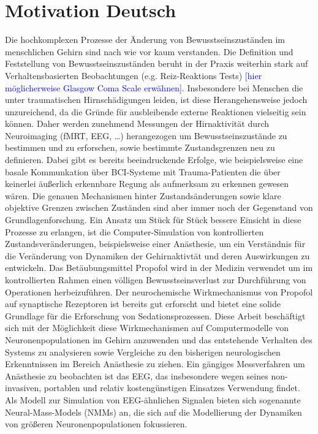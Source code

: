 \section{Motivation Deutsch}\label{sec:motivation-deutsch}
Die hochkomplexen Prozesse der Änderung von Bewusstseinszuständen im menschlichen Gehirn sind nach wie vor kaum
verstanden.
Die Definition und Feststellung von Bewusstseinszuständen beruht in der Praxis weiterhin stark auf Verhaltensbasierten
Beobachtungen (e.g. Reiz-Reaktions Tests) \textcolor{blue}{[hier möglicherweise Glasgow Coma Scale erwähnen]}.
Insbesondere bei Menschen die unter traumatischen Hirnschädigungen leiden,
ist diese Herangehensweise jedoch unzureichend, da die Gründe für ausbleibende externe Reaktionen vielseitig sein
können.
Daher werden zunehmend Messungen der Hirnaktivität durch Neuroimaging (fMRT, EEG, \dots) herangezogen um
Bewusstseinszustände
zu bestimmen und zu erforschen, sowie bestimmte Zustandsgrenzen neu zu definieren.
Dabei gibt es bereits beeindruckende Erfolge,
wie beispielsweise eine basale Kommunkation über BCI-Systeme mit Trauma-Patienten die über keinerlei äußerlich
erkennbare Regung als aufmerksam zu erkennen gewesen wären.
Die genauen Mechanismen hinter Zustandsänderungen sowie klare objektive Grenzen zwischen Zuständen sind aber
immer noch der Gegenstand von Grundlagenforschung.
Ein Ansatz um Stück für Stück bessere Einsicht in diese Prozesse zu erlangen, ist die Computer-Simulation von
kontrollierten Zustandsveränderungen, beispielsweise einer Anästhesie, um ein Verständnis für die Veränderung
von Dynamiken der Gehirnaktivtät und deren Auswirkungen zu entwickeln.
Das Betäubungsmittel Propofol wird in der Medizin verwendet um im kontrollierten Rahmen einen völligen
Bewusstseinsverlust zur Durchführung von Operationen herbeizuführen.
Der neurochemische Wirkmechanismus von Propofol auf synaptische Rezeptoren ist bereits gut
erforscht und bietet eine solide Grundlage für die Erforschung von Sedationsprozessen.
Diese Arbeit beschäftigt sich mit der Möglichkeit diese Wirkmechanismen auf Computermodelle von Neuronenpopulationen
im Gehirn anzuwenden und das entstehende Verhalten des Systems zu analysieren sowie Vergleiche zu den
bisherigen neurologischen Erkenntnissen im Bereich Anästhesie zu ziehen.
Ein gängiges Messverfahren um Anästhesie zu beobachten ist das EEG, das insbesondere wegen seines non-invasiven,
portablen und relativ kostengünstigen Einsatzes Verwendung findet.
Als Modell zur Simulation von EEG-ähnlichen Signalen bieten sich sogenannte Neural-Mass-Models (NMMs) an,
die sich auf die Modellierung der Dynamiken von größeren Neuronenpopulationen fokussieren.

